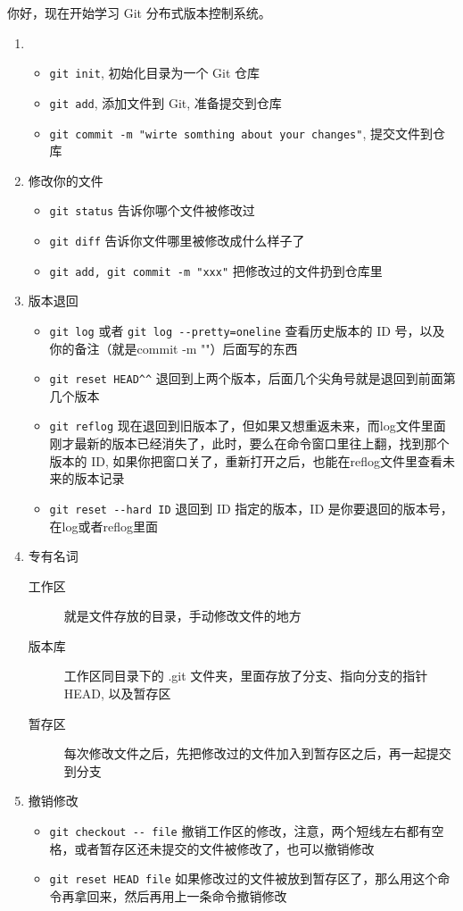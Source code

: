 \documentclass[UTF8]{ctexart}
\begin{document}
你好，现在开始学习 Git 分布式版本控制系统。\par
\begin{enumerate}
  \item
  \begin{itemize}
    \item \verb|git init|, 初始化目录为一个 Git 仓库
    \item \verb|git add|, 添加文件到 Git, 准备提交到仓库
    \item \verb|git commit -m "wirte somthing about your changes"|, 提交文件到仓库
  \end{itemize}
  \item 修改你的文件
  \begin{itemize}
    \item \verb|git status| 告诉你哪个文件被修改过
    \item \verb|git diff| 告诉你文件哪里被修改成什么样子了
    \item \verb|git add, git commit -m "xxx"| 把修改过的文件扔到仓库里
  \end{itemize}
  \item 版本退回
  \begin{itemize}
    \item \verb|git log| 或者 \verb|git log --pretty=oneline| 查看历史版本的 ID 号，以及你的备注（就是commit -m ""）后面写的东西
    \item \verb|git reset HEAD^^| 退回到上两个版本，后面几个尖角号就是退回到前面第几个版本
    \item \verb|git reflog| 现在退回到旧版本了，但如果又想重返未来，而log文件里面刚才最新的版本已经消失了，此时，要么在命令窗口里往上翻，找到那个版本的 ID, 如果你把窗口关了，重新打开之后，也能在reflog文件里查看未来的版本记录
    \item \verb|git reset --hard ID| 退回到 ID 指定的版本，ID 是你要退回的版本号，在log或者reflog里面
  \end{itemize}
  \item 专有名词
  \begin{description}
    \item[工作区] 就是文件存放的目录，手动修改文件的地方
    \item[版本库] 工作区同目录下的 .git 文件夹，里面存放了分支、指向分支的指针 HEAD, 以及暂存区
    \item[暂存区] 每次修改文件之后，先把修改过的文件加入到暂存区之后，再一起提交到分支
  \end{description}
  \item 撤销修改
  \begin{itemize}
    \item \verb|git checkout -- file| 撤销工作区的修改，注意，两个短线左右都有空格，或者暂存区还未提交的文件被修改了，也可以撤销修改
    \item \verb|git reset HEAD file| 如果修改过的文件被放到暂存区了，那么用这个命令再拿回来，然后再用上一条命令撤销修改
  \end{itemize}
\end{enumerate}
\end{document}
